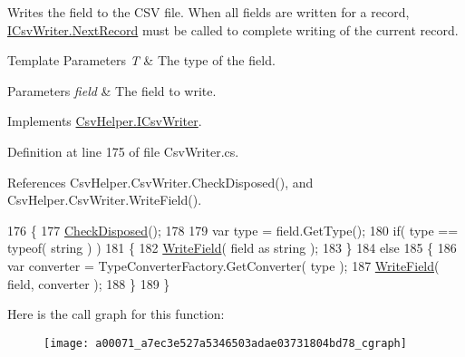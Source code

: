 Writes the field to the C\-S\-V file. When all fields are written for a record, \hyperlink{a00107_a6bb1687959808ea1219fa68e7f3060fa}{I\-Csv\-Writer.\-Next\-Record} must be called to complete writing of the current record. 


\begin{DoxyTemplParams}{Template Parameters}
{\em T} & The type of the field.\\
\hline
\end{DoxyTemplParams}

\begin{DoxyParams}{Parameters}
{\em field} & The field to write.\\
\hline
\end{DoxyParams}


Implements \hyperlink{a00107_ae9b669ef98e0c3ac3b2eb2345b9f095e}{Csv\-Helper.\-I\-Csv\-Writer}.



Definition at line 175 of file Csv\-Writer.\-cs.



References Csv\-Helper.\-Csv\-Writer.\-Check\-Disposed(), and Csv\-Helper.\-Csv\-Writer.\-Write\-Field().


\begin{DoxyCode}
176         \{
177             \hyperlink{a00071_a15e26ec8c5c935030677bee9a36d7c16}{CheckDisposed}();
178 
179             var type = field.GetType();
180             \textcolor{keywordflow}{if}( type == typeof( \textcolor{keywordtype}{string} ) )
181             \{
182                 \hyperlink{a00071_a994d9b339c4cda8bf83d5665b5c4ff1a}{WriteField}( field as \textcolor{keywordtype}{string} );
183             \}
184             \textcolor{keywordflow}{else}
185             \{
186                 var converter = TypeConverterFactory.GetConverter( type );
187                 \hyperlink{a00071_a994d9b339c4cda8bf83d5665b5c4ff1a}{WriteField}( field, converter );
188             \}
189         \}
\end{DoxyCode}


Here is the call graph for this function\-:
\nopagebreak
\begin{figure}[H]
\begin{center}
\leavevmode
\texttt{[image: a00071\_a7ec3e527a5346503adae03731804bd78\_cgraph]}
\end{center}
\end{figure}


